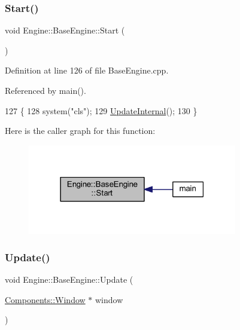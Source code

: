 \subsubsection{\texorpdfstring{Start()}{Start()}}
{\footnotesize\ttfamily void Engine\+::\+Base\+Engine\+::\+Start (\begin{DoxyParamCaption}{ }\end{DoxyParamCaption})\hspace{0.3cm}{\ttfamily [virtual]}}



Definition at line 126 of file Base\+Engine.\+cpp.



Referenced by main().


\begin{DoxyCode}
127 \{
128     system(\textcolor{stringliteral}{"cls"});
129     \mbox{\hyperlink{classEngine_1_1BaseEngine_aad3c237ca657b9f22f76fccf7fc7561f}{UpdateInternal}}();
130 \}
\end{DoxyCode}
Here is the caller graph for this function\+:
\nopagebreak
\begin{figure}[H]
\begin{center}
\leavevmode
\includegraphics[width=259pt]{classEngine_1_1BaseEngine_a525fdc7a1da7eecb514ad5763f06be79_icgraph}
\end{center}
\end{figure}
\mbox{\label{classEngine_1_1BaseEngine_a01c23c2073f08939a660f3b7a866852c}} 
\subsubsection{\texorpdfstring{Update()}{Update()}}
{\footnotesize\ttfamily void Engine\+::\+Base\+Engine\+::\+Update (\begin{DoxyParamCaption}\item[{\mbox{\hyperlink{classEngine_1_1Components_1_1Window}{Components\+::\+Window}} $\ast$}]{window }\end{DoxyParamCaption})\hspace{0.3cm}{\ttfamily [virtual]}}



